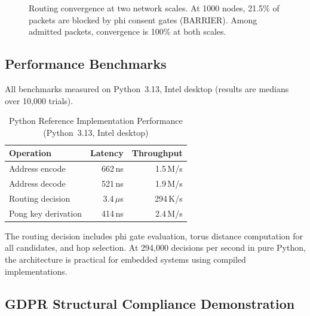 \documentclass[11pt,a4paper]{article}
\begin{document}
\begin{figure}[h]
\centering
{}
\caption{Routing convergence at two network scales. At 1000 nodes, 21.5\% of packets are blocked by phi consent gates (BARRIER). Among admitted packets, convergence is 100\% at both scales.}
\label{fig:convergence}
\end{figure}

\subsection{Performance Benchmarks}

All benchmarks measured on Python~3.13, Intel desktop (results are medians over 10{,}000 trials).

\begin{table}[h]
\centering
\begin{tabular}{lrr}
\toprule
\textbf{Operation} & \textbf{Latency} & \textbf{Throughput} \\
\midrule
Address encode & 662\,ns & 1.5\,M/s \\
Address decode & 521\,ns & 1.9\,M/s \\
Routing decision & 3.4\,$\mu$s & 294\,K/s \\
Pong key derivation & 414\,ns & 2.4\,M/s \\
\bottomrule
\end{tabular}
\caption{Python Reference Implementation Performance (Python~3.13, Intel desktop)}
\label{tab:perf}
\end{table}

The routing decision includes phi gate evaluation, torus distance computation for all candidates, and hop selection. At 294{,}000 decisions per second in pure Python, the architecture is practical for embedded systems using compiled implementations.

\subsection{GDPR Structural Compliance Demonstration}
\end{document}
